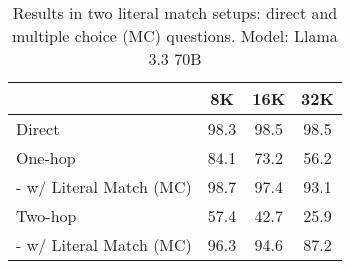 \begin{table}[t!]
        \small
	\setlength\tabcolsep{5pt}
	\centering
	\begin{tabular}{lccc}
		\toprule
          & {\textbf{8K}} & {\textbf{16K}} & {\textbf{32K}} \\
        \midrule
        Direct  & 98.3 & 98.5 & 98.5 \\
        \midrule
        One-hop & 84.1 & 73.2 & 56.2 \\
        \hspace{3pt}- w/ Literal Match (MC) & 98.7 & 97.4 & 93.1 \\
        \midrule
        Two-hop & 57.4 & 42.7 & 25.9 \\
        \hspace{3pt}- w/ Literal Match (MC) & 96.3 & 94.6 & 87.2 \\
		\bottomrule
	\end{tabular}
	\caption{Results in two literal match setups: direct and multiple choice (MC) questions. Model: Llama 3.3 70B}
	\label{tab:literal_match_ablation}
\end{table}